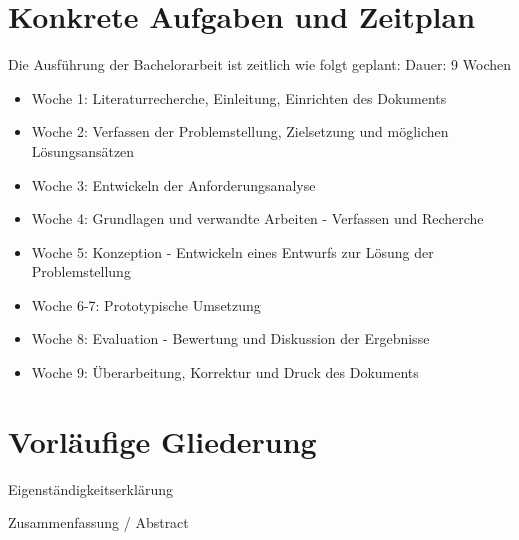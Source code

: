 \documentclass[11pt]{scrartcl}
\begin{document}
\pagebreak

\section{Konkrete Aufgaben und Zeitplan}

Die Ausführung der Bachelorarbeit ist zeitlich wie folgt geplant:
\newline
Dauer: 9 Wochen

\begin{itemize}
	\item Woche 1: Literaturrecherche, Einleitung, Einrichten des Dokuments
 	\item Woche 2: Verfassen der Problemstellung, Zielsetzung und möglichen Lösungsansätzen
 	\item Woche 3: Entwickeln der Anforderungsanalyse
 	\item Woche 4: Grundlagen und verwandte Arbeiten - Verfassen und Recherche
 	\item Woche 5: Konzeption - Entwickeln eines Entwurfs zur Lösung der Problemstellung
 	\item Woche 6-7: Prototypische Umsetzung
 	\item Woche 8: Evaluation - Bewertung und Diskussion der Ergebnisse
 	\item Woche 9: Überarbeitung, Korrektur und Druck des Dokuments
\end{itemize}


\section{\label{sec:gliederung}Vorläufige Gliederung}

{\parindent=5mm 
Eigenständigkeitserklärung

Zusammenfassung / Abstract}
\end{document}
